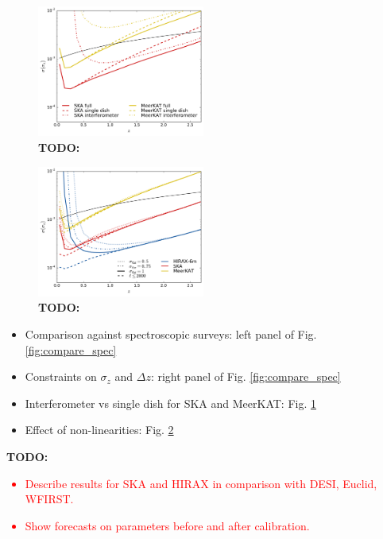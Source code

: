 \documentclass[prd,twocolumn]{revtex4}
\newcommand{\TODO}[1]{{\bf TODO:} \textcolor{red}{#1}}
\begin{document}
    \begin{figure}
      \centering
      \includegraphics[width=0.49\textwidth]{compare_if_sd}
      \caption{\TODO{}}
      \label{fig:compare_if_sd}
    \end{figure}
    \begin{figure}
      \centering
      \includegraphics[width=0.49\textwidth]{compare_nlin}
      \caption{\TODO{}}
      \label{fig:compare_nlin}
    \end{figure}
    \begin{itemize}
     \item Comparison against spectroscopic surveys: left panel of Fig. \ref{fig:compare_spec}
     \item Constraints on $\sigma_z$ and $\Delta z$: right panel of Fig. \ref{fig:compare_spec}
     \item Interferometer vs single dish for SKA and MeerKAT: Fig. \ref{fig:compare_if_sd}
     \item Effect of non-linearities: Fig. \ref{fig:compare_nlin}
    \end{itemize}

    \TODO{
      \begin{itemize}
        \item Describe results for SKA and HIRAX in comparison with DESI, Euclid, WFIRST.
        \item Show forecasts on parameters before and after calibration.
      \end{itemize}
    }
\end{document}
